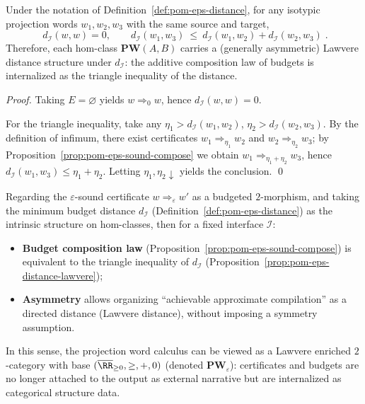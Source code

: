 \begin{proposition}\label{prop:pom-eps-distance-lawvere}
Under the notation of Definition~\ref{def:pom-eps-distance}, for any isotypic projection words \(w_1,w_2,w_3\) with the same source and target,
\[
\boxed{\;
d_{\mathcal I}(w,w)=0,\qquad
d_{\mathcal I}(w_1,w_3)\ \le\ d_{\mathcal I}(w_1,w_2)+d_{\mathcal I}(w_2,w_3)\; }.
\]
Therefore, each hom-class \(\mathbf{PW}(A,B)\) carries a (generally asymmetric) Lawvere distance structure under \(d_{\mathcal I}\): the additive composition law of budgets is internalized as the triangle inequality of the distance.
\end{proposition}
\begin{proof}
Taking \(E=\varnothing\) yields \(w\Longrightarrow_0 w\), hence \(d_{\mathcal I}(w,w)=0\).
\par
For the triangle inequality, take any \(\eta_1>d_{\mathcal I}(w_1,w_2)\), \(\eta_2>d_{\mathcal I}(w_2,w_3)\).
By the definition of infimum, there exist certificates \(w_1\Longrightarrow_{\eta_1} w_2\) and \(w_2\Longrightarrow_{\eta_2} w_3\);
by Proposition~\ref{prop:pom-eps-sound-compose} we obtain \(w_1\Longrightarrow_{\eta_1+\eta_2} w_3\), hence
\(
d_{\mathcal I}(w_1,w_3)\le \eta_1+\eta_2
\).
Letting \(\eta_1,\eta_2\downarrow\) yields the conclusion. \qed
\end{proof}

\begin{remark}\label{rem:pom-pw-eps-lawvere}
Regarding the \(\varepsilon\)-sound certificate \(w\Longrightarrow_\varepsilon w'\) as a budgeted \(2\)-morphism, and taking the minimum budget distance \(d_{\mathcal I}\) (Definition~\ref{def:pom-eps-distance}) as the intrinsic structure on hom-classes, then for a fixed interface \(\mathcal I\):
\begin{itemize}
  \item \textbf{Budget composition law} (Proposition~\ref{prop:pom-eps-sound-compose}) is equivalent to the triangle inequality of \(d_{\mathcal I}\) (Proposition~\ref{prop:pom-eps-distance-lawvere});
  \item \textbf{Asymmetry} allows organizing ``achievable approximate compilation'' as a directed distance (Lawvere distance), without imposing a symmetry assumption.
\end{itemize}
In this sense, the projection word calculus can be viewed as a Lawvere enriched \(2\)-category with base \((\overline{\RR}_{\ge 0},\ge,+,0)\) (denoted \(\mathbf{PW}_\varepsilon\)): certificates and budgets are no longer attached to the output as external narrative but are internalized as categorical structure data.
\end{remark}

